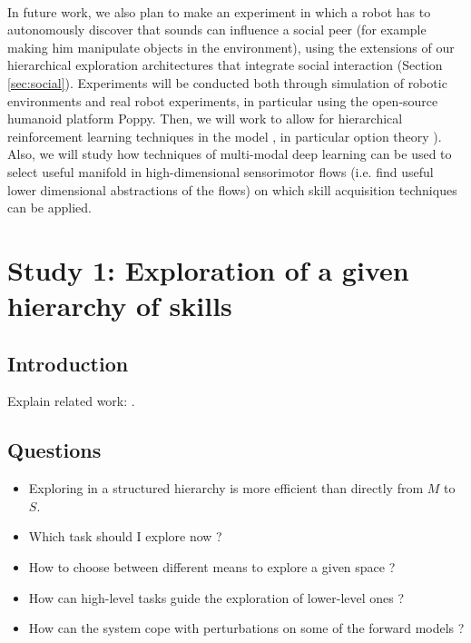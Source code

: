 \documentclass[12pt]{article}
\begin{document}
	\paragraph{}%
	In future work, we also plan to make an experiment in which a robot has to autonomously 
	discover that sounds can influence a social peer (for example making him
	manipulate objects in the environment), using the extensions of our hierarchical exploration architectures that integrate social interaction (Section \ref{sec:social}). 
	Experiments will be conducted both through simulation of robotic environments and real robot
	experiments, in particular using the open-source humanoid platform Poppy.
	Then, we will work to allow for
	hierarchical reinforcement learning techniques in the model \cite{botvinick2012hierarchical}, in particular option
	theory \cite{sutton1999between}). 
	Also, we will study how techniques
	of multi-modal deep learning \cite{ngiam2011multimodal} can be used to select useful manifold in high-dimensional sensorimotor flows 
	(i.e. find useful lower dimensional abstractions of the flows) on which
	skill acquisition techniques can be applied.
	
%

\newpage

\section{Study 1: Exploration of a given hierarchy of skills}
\label{study1}

	\subsection{Introduction}

		Explain related work: \cite{vig, ugur2014, ugur2015}.
	

	\subsection{Questions}

		\begin{itemize}
			\item Exploring in a structured hierarchy is more efficient than directly from $M$ to $S$.
			\item Which task should I explore now ?
			\item How to choose between different means to explore a given space ? 
			\item How can high-level tasks guide the exploration of lower-level ones ?
			\item How can the system cope with perturbations on some of the forward models ?		
		\end{itemize}
\end{document}
